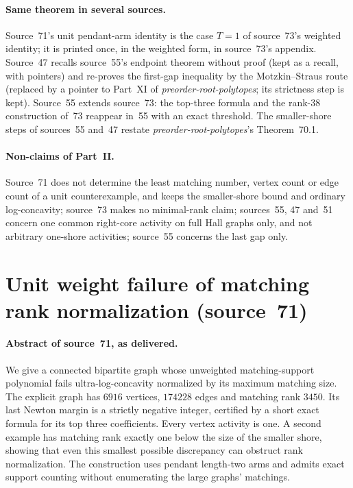 \documentclass[11pt,a4paper]{article}
\theoremstyle{remark}\newtheorem{remark}[theorem]{Remark}
\newcommand{\prp}{\emph{preorder-root-polytopes}}
\begin{document}
\paragraph{Same theorem in several sources.}
Source~71's unit pendant-arm identity is the case $T=1$ of source~73's
weighted identity; it is printed once, in the weighted form, in source~73's
appendix. Source~47 recalls source~55's endpoint theorem without proof (kept
as a recall, with pointers) and re-proves the first-gap inequality by the
Motzkin--Straus route (replaced by a pointer to Part~XI of \prp; its
strictness step is kept). Source~55 extends source~73: the top-three formula
and the rank-38 construction of~73 reappear in~55 with an exact threshold.
The smaller-shore steps of sources~55 and~47 restate \prp's Theorem~70.1.

\paragraph{Non-claims of Part~II.}
Source~71 does not determine the least matching number, vertex count or edge
count of a unit counterexample, and keeps the smaller-shore bound and
ordinary log-concavity; source~73 makes no minimal-rank claim; sources~55,
47 and~51 concern one common right-core activity on full Hall graphs only,
and not arbitrary one-shore activities; source~55 concerns the last gap only.

\section{Unit weight failure of matching rank normalization (source~71)}\label{mrn:src:71}
\paragraph{Abstract of source~71, as delivered.} We give a connected bipartite graph whose unweighted matching-support polynomial fails ultra-log-concavity normalized by its maximum matching size. The explicit graph has $6916$ vertices, $174228$ edges and matching rank $3450$. Its last Newton margin is a strictly negative integer, certified by a short exact formula for its top three coefficients. Every vertex activity is one. A second example has matching rank exactly one below the size of the smaller shore, showing that even this smallest possible discrepancy can obstruct rank normalization. The construction uses pendant length-two arms and admits exact support counting without enumerating the large graphs' matchings.
\end{document}
